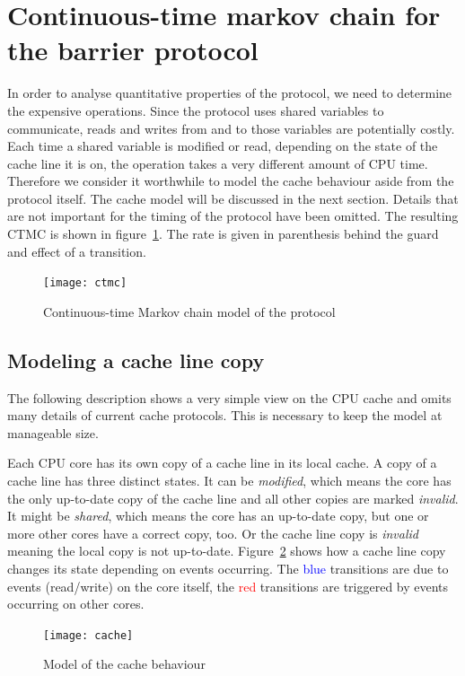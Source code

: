 \documentclass[a4paper, 10pt]{article}
\begin{document}
\clearpage

\section{Continuous-time markov chain for the barrier protocol}
In order to analyse quantitative properties of the protocol, we need to determine the expensive operations. Since the protocol uses shared variables to communicate, reads and writes from and to those variables are potentially costly. Each time a shared variable is modified or read, depending on the state of the cache line it is on, the operation takes a very different amount of CPU time. Therefore we consider it worthwhile to model the cache behaviour aside from the protocol itself. The cache model will be discussed in the next section. Details that are not important for the timing of the protocol have been omitted. The resulting CTMC is shown in figure~\ref{fig:ctmc}. The rate is given in parenthesis behind the guard and effect of a transition.
\begin{figure}[htbp]
	\centering
	\texttt{[image: ctmc]}
	\caption{Continuous-time Markov chain model of the protocol}
	\label{fig:ctmc}
\end{figure}
\subsection{Modeling a cache line copy}
The following description shows a very simple view on the CPU cache and omits many details of current cache protocols. This is necessary to keep the model at manageable size.

Each CPU core has its own copy of a cache line in its local cache. A copy of a cache line has three distinct states. It can be \emph{modified}, which means the core has the only up-to-date copy of the cache line and all other copies are marked \emph{invalid}. It might be \emph{shared}, which means the core has an up-to-date copy, but one or more other cores have a correct copy, too. Or the cache line copy is \emph{invalid} meaning the local copy is not up-to-date. Figure~\ref{fig:cache} shows how a cache line copy changes its state depending on events occurring. The \textcolor{blue}{blue} transitions are due to events (read/write) on the core itself, the \textcolor{red}{red} transitions are triggered by events occurring on other cores.
\begin{figure}[htbp]
	\centering
	\texttt{[image: cache]}
	\caption{Model of the cache behaviour}
	\label{fig:cache}
\end{figure}
\end{document}
